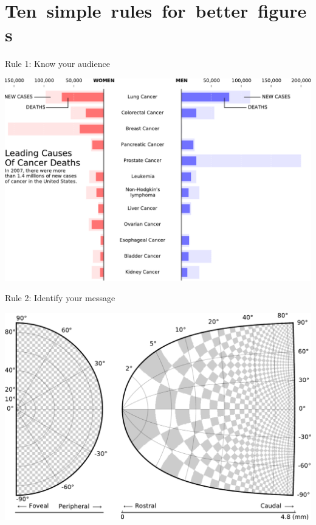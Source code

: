 \documentclass[10pt,aspectratio=169]{beamer}
\begin{document}


  
\section{Ten~simple~rules~for~better~figures}

\begin{frame}{Rule 1: Know your audience}
  \begin{center}
    \includegraphics[width=.75\textwidth]{rule-1.pdf}
  \end{center} 
\end{frame}

\begin{frame}{Rule 2: Identify your message}
  \begin{center}
    \includegraphics[width=.75\textwidth]{rule-2.pdf}
  \end{center} 
\end{frame}
\end{document}
